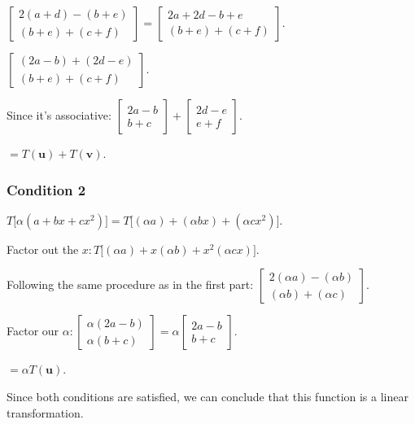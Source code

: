 \documentclass[]{article}
\begin{document}
\(\begin{bmatrix}2(a + d) - (b + e)\\ (b + e) + (c + f)\end{bmatrix} = \begin{bmatrix}2a + 2d - b + e \\ (b + e) + (c + f)\end{bmatrix}\).

\(\begin{bmatrix}(2a - b) + (2d - e)\\ (b + e) + (c + f)\end{bmatrix}\).

Since it's associative:
\(\begin{bmatrix}2a - b \\ b + c\end{bmatrix} + \begin{bmatrix}2d - e\\ e + f\end{bmatrix}\).

\(= T(\textbf{u}) + T(\textbf{v})\).

\subsubsection{Condition 2}\label{condition-2}

\(T\Big[\alpha(a + bx + cx^2)\Big] = T\Big[(\alpha a) + (\alpha bx) + (\alpha cx^2)\Big]\).

Factor out the
\(x: T\Big[(\alpha a) + x(\alpha b) + x^2(\alpha cx)\Big]\).

Following the same procedure as in the first part:
\(\begin{bmatrix}2(\alpha a) - (\alpha b)\\ (\alpha b) + (\alpha c)\end{bmatrix}\).

Factor our
\(\alpha: \begin{bmatrix}\alpha(2a - b)\\ \alpha(b + c)\end{bmatrix} = \alpha \begin{bmatrix}2a - b\\ b + c\end{bmatrix}\).

\(= \alpha T(\textbf{u})\).

Since both conditions are satisfied, we can conclude that this function
is a linear transformation.
\end{document}
